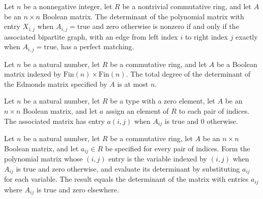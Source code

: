 \begin{theorem}
\label{Randomized.Matching.det_edmondsMatrix_ne_zero_iff}
\leanok
{}
Let $n$ be a nonnegative integer, let $R$ be a nontrivial commutative ring, and let $A$
be an $n\times n$ Boolean matrix. The determinant of the polynomial matrix with entry
$X_{i,j}$ when $A_{i,j}=\mathrm{true}$ and zero otherwise is nonzero if and only if the
associated bipartite graph, with an edge from left index $i$ to right index $j$ exactly
when $A_{i,j}=\mathrm{true}$, has a perfect matching.
\end{theorem}

\begin{theorem}
\label{Randomized.Matching.totalDegree_det_edmondsMatrix_le}
\leanok
{}
Let $n$ be a natural number, let $R$ be a commutative ring, and let $A$ be a Boolean
matrix indexed by $\text{Fin}(n)\times\text{Fin}(n)$. The total degree of the
determinant of the Edmonds matrix specified by $A$ is at most $n$.
\end{theorem}

\begin{definition}
\label{Randomized.Matching.lovaszMatrix}
\leanok
Let $n$ be a natural number, let $R$ be a type with a zero element, let $A$ be an
$n\times n$ Boolean matrix, and let $a$ assign an element of $R$ to each pair of
indices. The associated matrix has entry $a(i,j)$ when $A_{ij}$ is true and $0$
otherwise.
\end{definition}

\begin{theorem}
\label{Randomized.Matching.eval_det_edmondsMatrix}
\leanok
{}
Let $n$ be a natural number, let $R$ be a commutative ring, let $A$ be an $n\times n$
Boolean matrix, and let $a_{ij}\in R$ be specified for every pair of indices. Form the
polynomial matrix whose $(i,j)$ entry is the variable indexed by $(i,j)$ when $A_{ij}$
is true and zero otherwise, and evaluate its determinant by substituting $a_{ij}$ for
each variable. The result equals the determinant of the matrix with entries $a_{ij}$
where $A_{ij}$ is true and zero elsewhere.
\end{theorem}

